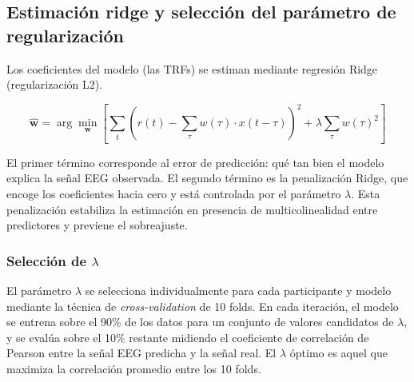 \subsection{Estimación ridge y selección del parámetro de regularización}

Los coeficientes del modelo (las TRFs) se estiman mediante regresión Ridge \citep{hoerl1970ridge} (regularización L2).

\begin{equation}
\hat{\mathbf{w}} = \arg\min_{\mathbf{w}} \left[ \sum_t \left( r(t) - \sum_{\tau} w(\tau) \cdot x(t-\tau) \right)^2 + \lambda \sum_{\tau} w(\tau)^2 \right]
\end{equation}

El primer término corresponde al error de predicción: qué tan bien el modelo explica la señal EEG observada. El segundo término es la penalización Ridge, que encoge los coeficientes hacia cero y está controlada por el parámetro $\lambda$. Esta penalización estabiliza la estimación en presencia de multicolinealidad entre predictores y previene el sobreajuste.

\subsubsection{Selección de $\lambda$}

El parámetro $\lambda$ se selecciona individualmente para cada participante y modelo mediante la técnica de \textit{cross-validation} de 10 folds. En cada iteración, el modelo se entrena sobre el 90\% de los datos para un conjunto de valores candidatos 
de $\lambda$, y se evalúa sobre el 10\% restante midiendo el coeficiente de correlación 
de Pearson entre la señal EEG predicha y la señal real. El $\lambda$ óptimo es aquel 
que maximiza la correlación promedio entre los 10 folds.